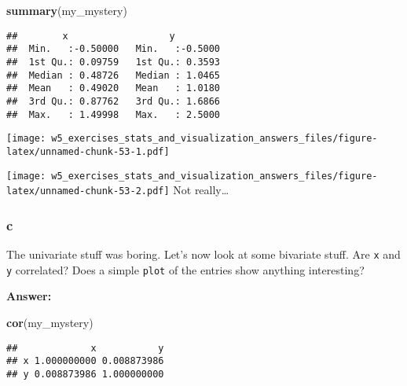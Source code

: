 \documentclass[]{article}
\newenvironment{Shaded}{\begin{snugshade}}{\end{snugshade}}
\newcommand{\KeywordTok}[1]{\textcolor[rgb]{0.13,0.29,0.53}{\textbf{#1}}}
\newcommand{\NormalTok}[1]{#1}
\newcommand{\OperatorTok}[1]{\textcolor[rgb]{0.81,0.36,0.00}{\textbf{#1}}}
\begin{document}
\begin{Shaded}
\begin{Highlighting}[]
\KeywordTok{summary}\NormalTok{(my_mystery)}
\end{Highlighting}
\end{Shaded}

\begin{verbatim}
##        x                  y          
##  Min.   :-0.50000   Min.   :-0.5000  
##  1st Qu.: 0.09759   1st Qu.: 0.3593  
##  Median : 0.48726   Median : 1.0465  
##  Mean   : 0.49020   Mean   : 1.0180  
##  3rd Qu.: 0.87762   3rd Qu.: 1.6866  
##  Max.   : 1.49998   Max.   : 2.5000
\end{verbatim}

\begin{Shaded}
\end{Shaded}

\texttt{[image: w5\_exercises\_stats\_and\_visualization\_answers\_files/figure-latex/unnamed-chunk-53-1.pdf]}

\begin{Shaded}
\end{Shaded}

\texttt{[image: w5\_exercises\_stats\_and\_visualization\_answers\_files/figure-latex/unnamed-chunk-53-2.pdf]}
Not really\ldots{}

\hypertarget{c-9}{%
\subsubsection{c}\label{c-9}}

The univariate stuff was boring. Let's now look at some bivariate stuff.
Are \texttt{x} and \texttt{y} correlated? Does a simple \texttt{plot} of
the entries show anything interesting?

\textbf{Answer:}

\begin{Shaded}
\begin{Highlighting}[]
\KeywordTok{cor}\NormalTok{(my_mystery)}
\end{Highlighting}
\end{Shaded}

\begin{verbatim}
##             x           y
## x 1.000000000 0.008873986
## y 0.008873986 1.000000000
\end{verbatim}
\end{document}
